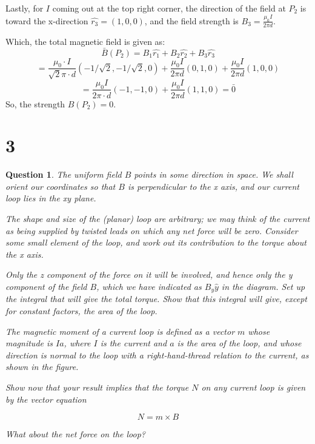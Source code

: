 \documentclass{article}
\newtheorem{question}{Question}
\begin{document}
Lastly, for $I$ coming out at the top right corner, the direction of the field at $P_2$ is toward the x-direction $\hat{r_3}=(1,0,0)$,
and the field strength is $B_3 = \frac{\mu_0 I}{2\pi d}$.

\hfill

Which, the total magnetic field is given as:
$$\bar{B}(P_2) = B_1\hat{r_1}+B_2\hat{r_2}+B_3\hat{r_3}$$
$$= \frac{\mu_0 \cdot I}{\sqrt{2}\pi \cdot d}(-1/\sqrt{2},-1/\sqrt{2},0) + \frac{\mu_0 I}{2\pi d}(0,1,0)+\frac{\mu_0 I}{2\pi d}(1,0,0)$$
$$ = \frac{\mu_0I}{2\pi\cdot d}(-1,-1,0) + \frac{\mu_0I}{2\pi d}(1,1,0) = \bar{0}$$
So, the strength $B(P_2)=0$.

\hfill

\hfill

\section*{3}
\begin{myBox}[]{}
    \begin{question}
        The uniform field $B$ points in some direction in space. We shall orient our coordinates
        so that $B$ is perpendicular to the x axis, and our current loop lies in
        the xy plane. 
        
        The shape and size of the (planar)
        loop are arbitrary; we may think of the current as being supplied
        by twisted leads on which any net force will be zero. Consider
        some small element of the loop, and work out its contribution to
        the torque about the x axis. 
        
        Only the z component of the force on
        it will be involved, and hence only the y component of the field $B$,
        which we have indicated as $B_y\hat{y}$ in the diagram. Set up the integral
        that will give the total torque. Show that this integral will give,
        except for constant factors, the area of the loop.

        \hfill

        The magnetic moment of a current loop is defined as a vector $m$ whose magnitude is $Ia$, 
        where $I$ is the current and $a$ is the area of the loop, 
        and whose direction is normal to the loop with
        a right-hand-thread relation to the current, as shown in the figure. 
        
        Show now that your result implies that the torque $N$
        on any current loop is given by the vector equation

        $$N=m\times B$$

        What about the net force on the loop?
    \end{question}
\end{myBox}
\end{document}
